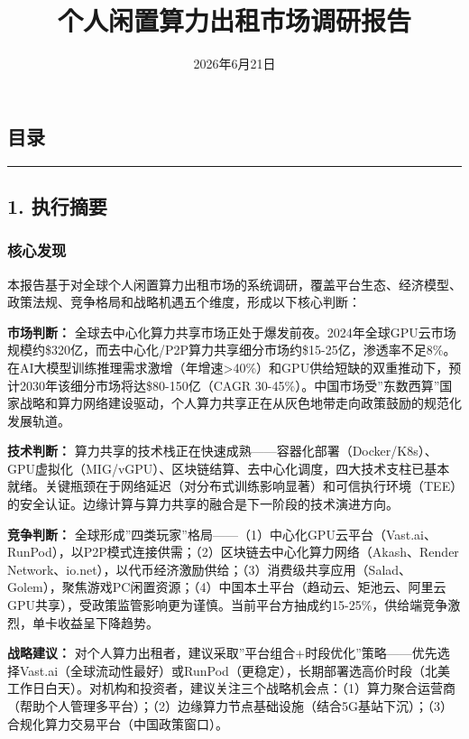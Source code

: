 \documentclass[UTF8,a4paper,12pt]{ctexart}
\title{个人闲置算力出租市场调研报告}
\date{2026年6月21日}
\begin{document}
\maketitle
\tableofcontents\newpage
\subsection{目录}\label{ux76eeux5f55}

\begin{center}\rule{0.5\linewidth}{0.5pt}\end{center}

\pagebreak

\subsection{1. 执行摘要}\label{ux6267ux884cux6458ux8981}

\subsubsection{核心发现}\label{ux6838ux5fc3ux53d1ux73b0}

本报告基于对全球个人闲置算力出租市场的系统调研，覆盖平台生态、经济模型、政策法规、竞争格局和战略机遇五个维度，形成以下核心判断：

\textbf{市场判断：}
全球去中心化算力共享市场正处于爆发前夜。2024年全球GPU云市场规模约\$320亿，而去中心化/P2P算力共享细分市场约\$15-25亿，渗透率不足8\%。在AI大模型训练推理需求激增（年增速\textgreater40\%）和GPU供给短缺的双重推动下，预计2030年该细分市场将达\$80-150亿（CAGR
30-45\%）。中国市场受''东数西算''国家战略和算力网络建设驱动，个人算力共享正在从灰色地带走向政策鼓励的规范化发展轨道。

\textbf{技术判断：}
算力共享的技术栈正在快速成熟------容器化部署（Docker/K8s）、GPU虚拟化（MIG/vGPU）、区块链结算、去中心化调度，四大技术支柱已基本就绪。关键瓶颈在于网络延迟（对分布式训练影响显著）和可信执行环境（TEE）的安全认证。边缘计算与算力共享的融合是下一阶段的技术演进方向。

\textbf{竞争判断：}
全球形成''四类玩家''格局------（1）中心化GPU云平台（Vast.ai、RunPod），以P2P模式连接供需；（2）区块链去中心化算力网络（Akash、Render
Network、io.net），以代币经济激励供给；（3）消费级共享应用（Salad、Golem），聚焦游戏PC闲置资源；（4）中国本土平台（趋动云、矩池云、阿里云GPU共享），受政策监管影响更为谨慎。当前平台方抽成约15-25\%，供给端竞争激烈，单卡收益呈下降趋势。

\textbf{战略建议：}
对个人算力出租者，建议采取''平台组合+时段优化''策略------优先选择Vast.ai（全球流动性最好）或RunPod（更稳定），长期部署选高价时段（北美工作日白天）。对机构和投资者，建议关注三个战略机会点：（1）算力聚合运营商（帮助个人管理多平台）；（2）边缘算力节点基础设施（结合5G基站下沉）；（3）合规化算力交易平台（中国政策窗口）。
\end{document}
